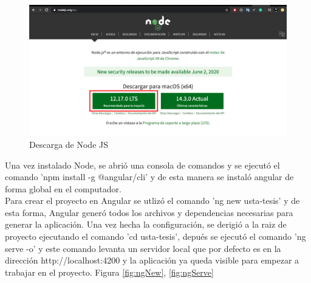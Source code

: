         \begin{figure}[H]
            \begin{center}
                \includegraphics[width = 15cm]{3Proyecto/node}
                \caption{ Descarga de Node JS } 
                \label{fig:node}
           \end{center}
        \end{figure}

        Una vez instalado Node, se abrió una consola de comandos y se ejecutó el comando 'npm install -g @angular/cli' y de esta manera se instaló angular de forma global en el computador.\\

        Para crear el proyecto en Angular se utlizó el comando 'ng new usta-tesis' y de esta forma, Angular generó todos los archivos y dependencias necesarias para generar la aplicación. Una vez hecha la configuración, se derigió a la raiz de proyecto ejecutando el comando 'cd usta-tesis', depués se ejecutó el comando 'ng serve -o' y este comando levanta un servidor local que por defecto es en la dirección http://localhost:4200 y la aplicación ya queda visible para empezar a trabajar en el proyecto. Figura \ref{fig:ngNew}, \ref{fig:ngServe}\\

